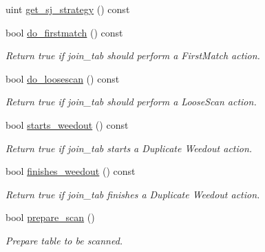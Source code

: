 \begin{DoxyCompactItemize}
\item 
uint \mbox{\hyperlink{group__Query__Optimizer_gaee0363af5ecbde624f02fbc38a695a3b}{get\+\_\+sj\+\_\+strategy}} () const
\item 
\mbox{\label{classQEP__TAB_a856221b9a7a8df645e86ba18ea568f6e}} 
bool \mbox{\hyperlink{classQEP__TAB_a856221b9a7a8df645e86ba18ea568f6e}{do\+\_\+firstmatch}} () const
\begin{DoxyCompactList}\small\item\em Return true if join\+\_\+tab should perform a First\+Match action. \end{DoxyCompactList}\item 
\mbox{\label{classQEP__TAB_aab88801166de382cd8058db15510ff44}} 
bool \mbox{\hyperlink{classQEP__TAB_aab88801166de382cd8058db15510ff44}{do\+\_\+loosescan}} () const
\begin{DoxyCompactList}\small\item\em Return true if join\+\_\+tab should perform a Loose\+Scan action. \end{DoxyCompactList}\item 
\mbox{\label{classQEP__TAB_a92bb3abb3400670507f35b937645e33c}} 
bool \mbox{\hyperlink{classQEP__TAB_a92bb3abb3400670507f35b937645e33c}{starts\+\_\+weedout}} () const
\begin{DoxyCompactList}\small\item\em Return true if join\+\_\+tab starts a Duplicate Weedout action. \end{DoxyCompactList}\item 
\mbox{\label{classQEP__TAB_aa1dd3dc4df987e1ff4e55cf9d556ea1f}} 
bool \mbox{\hyperlink{classQEP__TAB_aa1dd3dc4df987e1ff4e55cf9d556ea1f}{finishes\+\_\+weedout}} () const
\begin{DoxyCompactList}\small\item\em Return true if join\+\_\+tab finishes a Duplicate Weedout action. \end{DoxyCompactList}\item 
bool \mbox{\hyperlink{group__Query__Executor_ga0f7e9ff5a681a6bcc59e6e1f9af62b76}{prepare\+\_\+scan}} ()
\begin{DoxyCompactList}\small\item\em Prepare table to be scanned. \end{DoxyCompactList}\item 

\end{DoxyCompactItemize}
